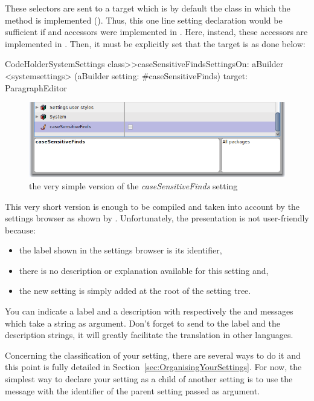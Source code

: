 \documentclass[a4paper,10pt,twoside]{book}
\begin{document}
These selectors are sent to a target which is by default the class in which the method is implemented (\ie {}). Thus, this one line setting declaration would be sufficient if   and  accessors were implemented in . Here, instead, these accessors are implemented in . Then, it must be explicitly set that the target is  as done below:
\begin{code}{}
CodeHolderSystemSettings class>>caseSensitiveFindsSettingsOn: aBuilder
	<systemsettings>
	(aBuilder setting: #caseSensitiveFinds) 
		target: ParagraphEditor
\end{code}
\begin{figure}[tbh]
\begin{center}
\includegraphics[scale=0.4]{caseSensitiveFinds_setting_declaration2}
\caption{the very simple version of the \textit{caseSensitiveFinds} setting}
\end{center}
\end{figure}
This very short version is enough to be compiled and taken into account by the settings browser as shown by .
Unfortunately, the presentation is not user-friendly because:
\begin{itemize}
\item the label shown in the settings browser is its identifier,
\item there is no description or explanation available for this setting and,
\item the new setting is simply added at the root of the setting tree. 
\end{itemize}
You can indicate a label and a description with respectively the  and  messages which take a string as argument. Don't forget to send  to the label and the description strings, it will greatly facilitate the translation in other languages.

Concerning the classification of your setting, there are several ways to do it and this point is fully detailed in Section~\ref{sec:OrganisingYourSettings}. For now, the simplest way to declare your setting as a child of another setting is to use the  message with the identifier of the parent setting passed as argument. 
\end{document}
